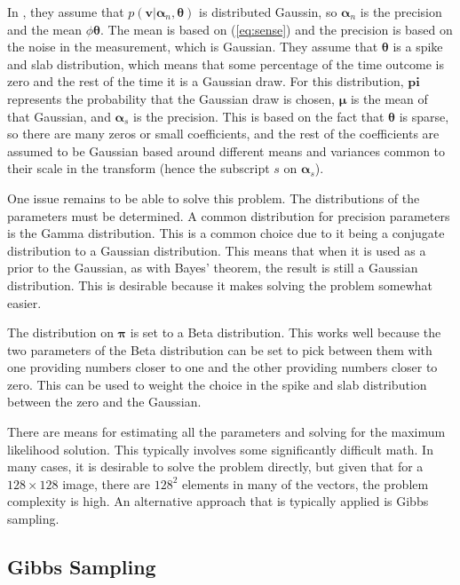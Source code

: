 \documentclass{IEEEtran}
\begin{document}
In \cite{He09}, they assume that
$p(\mathbf{v}|\mathbf{\alpha}_n,\mathbf{\theta})$ is distributed Gaussin,
so $\mathbf{\alpha}_n$ is the precision and the mean $\phi
\mathbf{\theta}$.  The mean is based on (\ref{eq:sense}) and the
precision is based on the noise in the measurement, which is
Gaussian.  They assume that $\mathbf{\theta}$ is a spike
and slab distribution, which means that some percentage of the time
outcome is zero and the rest of the time it is a Gaussian draw.  For this distribution,
$\mathbf{pi}$ represents the probability that the Gaussian draw is
chosen, $\mathbf{\mu}$ is the mean of that Gaussian, and
$\mathbf{\alpha}_s$ is the precision.  This is based on the fact that
$\mathbf{\theta}$ is sparse, so there are many zeros or small
coefficients, and the rest of the coefficients are assumed to be
Gaussian based around different means and variances common to their
scale in the transform (hence the subscript $s$ on
$\mathbf{\alpha}_s$).

One issue remains to be able to solve this problem.  The distributions of the
parameters must be determined.  A common distribution for precision
parameters is the Gamma distribution.  This is a common choice due to
it being a conjugate distribution to a Gaussian distribution.  This
means that when it is used as a prior to the Gaussian, as with Bayes'
theorem, the result is still a Gaussian distribution.  This is
desirable because it makes solving the problem somewhat easier. 

The distribution on $\mathbf{\pi}$ is set to a Beta distribution.  This
works well because the two parameters of the Beta distribution can be
set to pick between them with one providing numbers closer to one and
the other providing numbers closer to zero.  This can be used to
weight the choice in the spike and slab distribution between the zero
and the Gaussian.  

There are means for estimating all the parameters and solving for the
maximum likelihood solution.  This typically involves some
significantly difficult math.  In many cases, it is desirable to solve
the problem directly, but given that for a $128\times128$ image, there
are $128^2$ elements in many of the vectors, the problem complexity is
high.  An alternative approach that is typically applied is Gibbs
sampling.

\subsection{Gibbs Sampling}
\end{document}
